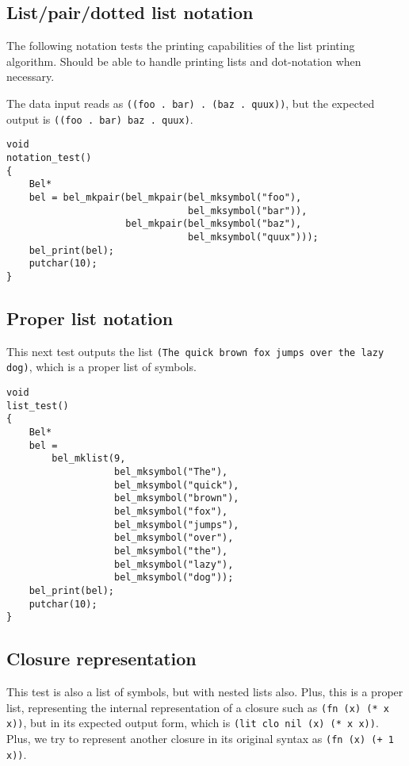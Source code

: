 \documentclass[openright,a4paper,twoside,12pt]{memoir}
\begin{document}
\subsection{List/pair/dotted list notation}
\label{sec:org6d8f13b}

The following notation tests the printing capabilities of the list
printing algorithm. Should be able to handle printing lists and
dot-notation when necessary.

The data input reads as \texttt{((foo . bar) . (baz . quux))}, but the expected
output is \texttt{((foo . bar) baz . quux)}.

\begin{verbatim}
void
notation_test()
{
    Bel*
    bel = bel_mkpair(bel_mkpair(bel_mksymbol("foo"),
                                bel_mksymbol("bar")),
                     bel_mkpair(bel_mksymbol("baz"),
                                bel_mksymbol("quux")));
    bel_print(bel);
    putchar(10);
}
\end{verbatim}

\subsection{Proper list notation}
\label{sec:org04e1b38}

This next test outputs the list \texttt{(The quick brown fox jumps over the
lazy dog)}, which is a proper list of symbols.

\begin{verbatim}
void
list_test()
{
    Bel*
    bel =
        bel_mklist(9,
                   bel_mksymbol("The"),
                   bel_mksymbol("quick"),
                   bel_mksymbol("brown"),
                   bel_mksymbol("fox"),
                   bel_mksymbol("jumps"),
                   bel_mksymbol("over"),
                   bel_mksymbol("the"),
                   bel_mksymbol("lazy"),
                   bel_mksymbol("dog"));
    bel_print(bel);
    putchar(10);
}
\end{verbatim}

\subsection{Closure representation}
\label{sec:org1deb0d6}

This test is also a list of symbols, but with nested lists also. Plus,
this is a proper list, representing the internal representation of a
closure such as \texttt{(fn (x) (* x x))}, but in its expected output form,
which is \texttt{(lit clo nil (x) (* x x))}. Plus, we try to represent another
closure in its original syntax as \texttt{(fn (x) (+ 1 x))}.
\end{document}
